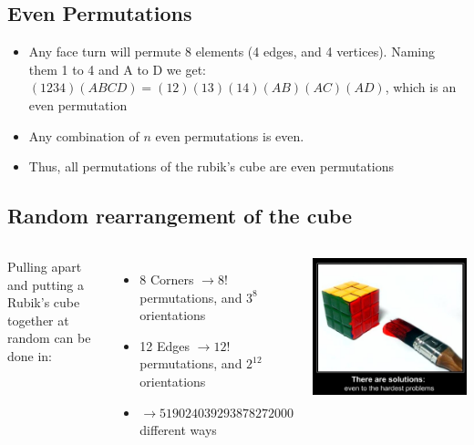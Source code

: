 \documentclass[xcolor=pdftex,dvipsnames,table]{beamer}
\begin{document}
\subsection{Even Permutations}
\begin{frame}
  \begin{itemize}
    \item Any face turn will permute 8 elements (4 edges, and 4 vertices). Naming them 1 to 4 and A to D we get: $(1234)(ABCD) = (12)(13)(14)(AB)(AC)(AD)$, which is an even permutation
    \item Any combination of $n$ even permutations is even.
    \item Thus, all permutations of the rubik's cube are even permutations
  \end{itemize}
\end{frame}

\subsection{Random rearrangement of the cube}
\begin{frame}
  \begin{columns}[cc]
   \column{2.5in}
  Pulling apart and putting a Rubik's cube together at random can be done in:
  \begin{itemize}
    \item 8 Corners $\rightarrow 8!$ permutations, and $3^8$ orientations
    \item 12 Edges $\rightarrow 12!$ permutations, and $2^{12}$ orientations
    \item $\rightarrow 519024039293878272000$ different ways
    \end{itemize}
  \column{1.5in}
  \includegraphics[scale=0.15]{solutionrubik.jpg}
  \end{columns}
\end{frame}
\end{document}
